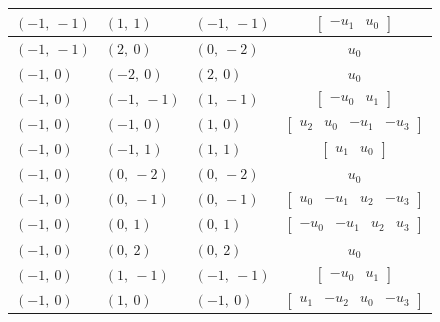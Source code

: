 \documentclass[11pt]{article}
\theoremstyle{definition}
\begin{document}
\begin{longtable}{|l|l|l|c|}
    \hline
    $\left( -1, \  -1\right)$ & $\left( 1, \  1\right)$ & $\left( -1, \  -1\right)$ & $\left[\begin{matrix}- u_{1} & u_{0}\end{matrix}\right]$ \\
    \hline
    $\left( -1, \  -1\right)$ & $\left( 2, \  0\right)$ & $\left( 0, \  -2\right)$ & $u_{0}$ \\
    \hline
    $\left( -1, \  0\right)$ & $\left( -2, \  0\right)$ & $\left( 2, \  0\right)$ & $u_{0}$ \\
    \hline
    $\left( -1, \  0\right)$ & $\left( -1, \  -1\right)$ & $\left( 1, \  -1\right)$ & $\left[\begin{matrix}- u_{0} & u_{1}\end{matrix}\right]$ \\
    \hline
    $\left( -1, \  0\right)$ & $\left( -1, \  0\right)$ & $\left( 1, \  0\right)$ & $\left[\begin{matrix}u_{2} & u_{0} & - u_{1} & - u_{3}\end{matrix}\right]$ \\
    \hline
    $\left( -1, \  0\right)$ & $\left( -1, \  1\right)$ & $\left( 1, \  1\right)$ & $\left[\begin{matrix}u_{1} & u_{0}\end{matrix}\right]$ \\
    \hline
    $\left( -1, \  0\right)$ & $\left( 0, \  -2\right)$ & $\left( 0, \  -2\right)$ & $u_{0}$ \\
    \hline
    $\left( -1, \  0\right)$ & $\left( 0, \  -1\right)$ & $\left( 0, \  -1\right)$ & $\left[\begin{matrix}u_{0} & - u_{1} & u_{2} & - u_{3}\end{matrix}\right]$ \\
    \hline
    $\left( -1, \  0\right)$ & $\left( 0, \  1\right)$ & $\left( 0, \  1\right)$ & $\left[\begin{matrix}- u_{0} & - u_{1} & u_{2} & u_{3}\end{matrix}\right]$ \\
    \hline
    $\left( -1, \  0\right)$ & $\left( 0, \  2\right)$ & $\left( 0, \  2\right)$ & $u_{0}$ \\
    \hline
    $\left( -1, \  0\right)$ & $\left( 1, \  -1\right)$ & $\left( -1, \  -1\right)$ & $\left[\begin{matrix}- u_{0} & u_{1}\end{matrix}\right]$ \\
    \hline
    $\left( -1, \  0\right)$ & $\left( 1, \  0\right)$ & $\left( -1, \  0\right)$ & $\left[\begin{matrix}u_{1} & - u_{2} & u_{0} & - u_{3}\end{matrix}\right]$ \\

\end{longtable}
\end{document}
